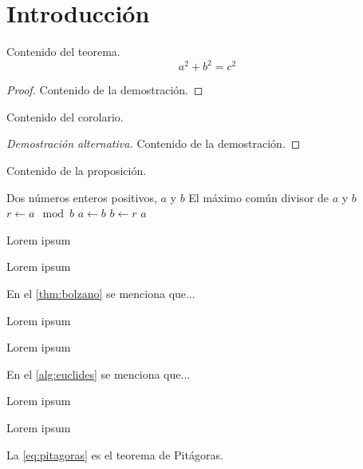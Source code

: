 \section*{Introducción}

\begin{teorema}\label{thm:bolzano}
    Contenido del teorema.
    \begin{equation}\label{eq:pitagoras}
    a^2 + b^2 = c^2
    \end{equation}
\end{teorema}

\begin{proof}
    Contenido de la demostración.
\end{proof}

\begin{corolario}
    Contenido del corolario.
\end{corolario}

\begin{proof}[Demostración alternativa]
    Contenido de la demostración.
\end{proof}

\begin{proposicion}
    Contenido de la proposición.
\end{proposicion}

\begin{algorithm}
  \caption{Euclides para calcular el MCD}\label{alg:euclides} %
  \begin{algorithmic}[1] %
    \Require Dos números enteros positivos, \(a\) y \(b\)
    \Ensure El máximo común divisor de \(a\) y \(b\)
      \State \(r \gets a \mod b\)
      \State \(a \gets b\)
      \State \(b \gets r\)
    \EndWhile
    \State \Return \(a\)
  \end{algorithmic}
\end{algorithm}

Lorem ipsum 

Lorem ipsum 

En el \cref{thm:bolzano} se menciona que...

Lorem ipsum 

Lorem ipsum 

En el \cref{alg:euclides} se menciona que...

Lorem ipsum 

Lorem ipsum 

La \cref{eq:pitagoras} es el teorema de Pitágoras.

